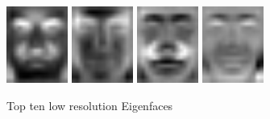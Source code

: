 \begin{figure}[hbt]
  \includegraphics[width=0.18\textwidth]{../results/L_rez/eigenfaces/largest7.jpg}
  \includegraphics[width=0.18\textwidth]{../results/L_rez/eigenfaces/largest8.jpg}
  \includegraphics[width=0.18\textwidth]{../results/L_rez/eigenfaces/largest9.jpg}
  \includegraphics[width=0.18\textwidth]{../results/L_rez/eigenfaces/largest10.jpg}
  \caption{Top ten low resolution Eigenfaces}
  \label{fig:top_efaces_l}
\end{figure}

~\vfill

